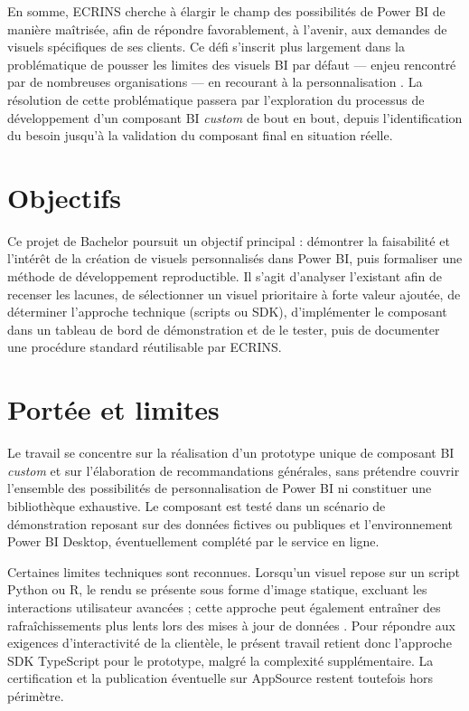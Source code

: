 En somme, ECRINS cherche à élargir le champ des possibilités de Power BI de manière maîtrisée, afin de répondre favorablement, à l’avenir, aux demandes de visuels spécifiques de ses clients. Ce défi s’inscrit plus largement dans la problématique de pousser les limites des visuels BI par défaut — enjeu rencontré par de nombreuses organisations — en recourant à la personnalisation \parencite{Uttam2025}. La résolution de cette problématique passera par l’exploration du processus de développement d’un composant BI \emph{custom} de bout en bout, depuis l’identification du besoin jusqu’à la validation du composant final en situation réelle.  

\section{Objectifs}

Ce projet de Bachelor poursuit un objectif principal : démontrer la faisabilité et l’intérêt de la création de visuels personnalisés dans Power BI, puis formaliser une méthode de développement reproductible. Il s’agit d’analyser l’existant afin de recenser les lacunes, de sélectionner un visuel prioritaire à forte valeur ajoutée, de déterminer l’approche technique (scripts ou SDK), d’implémenter le composant dans un tableau de bord de démonstration et de le tester, puis de documenter une procédure standard réutilisable par ECRINS.  

\section{Portée et limites}

Le travail se concentre sur la réalisation d’un prototype unique de composant BI \emph{custom} et sur l’élaboration de recommandations générales, sans prétendre couvrir l’ensemble des possibilités de personnalisation de Power BI ni constituer une bibliothèque exhaustive. Le composant est testé dans un scénario de démonstration reposant sur des données fictives ou publiques et l’environnement Power BI Desktop, éventuellement complété par le service en ligne.  

Certaines limites techniques sont reconnues. Lorsqu’un visuel repose sur un script Python ou R, le rendu se présente sous forme d’image statique, excluant les interactions utilisateur avancées ; cette approche peut également entraîner des rafraîchissements plus lents lors des mises à jour de données \parencite{RealPython2023}. Pour répondre aux exigences d’interactivité de la clientèle, le présent travail retient donc l’approche SDK TypeScript pour le prototype, malgré la complexité supplémentaire. La certification et la publication éventuelle sur AppSource restent toutefois hors périmètre.


